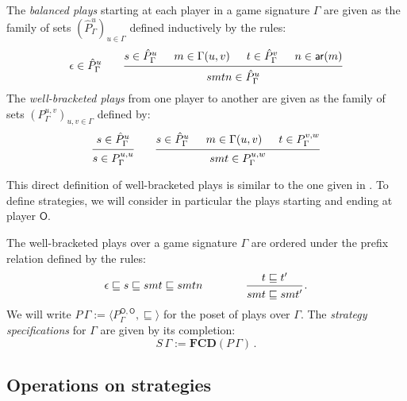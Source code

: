 \documentclass[sigplan,screen]{acmart}
\newcommand{\kw}[1]{\ensuremath{ \mathsf{#1} }}
\begin{document}
\begin{definition}
The \emph{balanced plays}
starting at each player in
a game signature $\Gamma$
are given
as the family of sets
$(\hat{P}_\Gamma^u)_{u \in \Gamma}$
defined inductively by the rules:
\[
  \epsilon \in \hat{P}_\Gamma^u
  \qquad
  \begin{prooftree}
    \hypo{s \in \hat{P}_\Gamma^u}
    \hypo{m \in \Gamma(u, v)}
    \hypo{t \in \hat{P}_\Gamma^v}
    \hypo{n \in \kw{ar}(m)}
    \infer4{smtn \in \hat{P}_\Gamma^u}
  \end{prooftree}
\]
The \emph{well-bracketed plays}
from one player to another
are given as the family of sets
$(P_\Gamma^{u,v})_{u,v \in \Gamma}$
defined by:
\[
  \begin{prooftree}
    \hypo{s \in \hat{P}_\Gamma^u}
    \infer1{s \in P_\Gamma^{u,u}}
  \end{prooftree}
  \qquad
  \begin{prooftree}
    \hypo{s \in \hat{P}_\Gamma^u}
    \hypo{m \in \Gamma(u, v)}
    \hypo{t \in P_\Gamma^{v,w}}
    \infer3{smt \in P_\Gamma^{u,w}}
  \end{prooftree}
\]
\end{definition}

This direct definition of well-bracketed plays
is similar to the one given in \cite{mwjava}.
To define strategies,
we will consider in particular the plays
starting and ending at player $\kw{O}$.

\begin{definition}
The well-bracketed plays over a game signature $\Gamma$
are ordered under the prefix relation
defined by the rules:
\[
  \epsilon \sqsubseteq s \sqsubseteq smt \sqsubseteq smtn
  \qquad \qquad
  \begin{prooftree}
    \hypo{t \sqsubseteq t'}
    \infer1{smt \sqsubseteq smt'}
  \end{prooftree} \,.
\]
We will write
$P \, \Gamma := \langle P_\Gamma^{\kw{O},\kw{O}}, {\sqsubseteq} \rangle$
for the poset of plays over $\Gamma$.
The \emph{strategy specifications} for $\Gamma$
are given by its completion:
\[
    S \, \Gamma := \mathbf{FCD}(P \, \Gamma) \,.
\]
\end{definition}


\subsection{Operations on strategies} %
\end{document}
